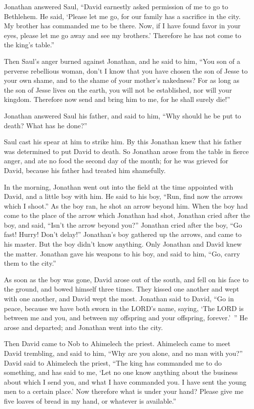 \myverse{}Jonathan answered Saul, “David earnestly asked permission of
me to go to Bethlehem.
\myverse{}He said, ‘Please let me go, for our family has a sacrifice in the city. My
brother has commanded me to be there. Now, if I have found favor in your eyes, please let me go away and
see my brothers.’ Therefore he has not come to the king’s table.”

\myverse{}Then Saul’s anger burned against Jonathan, and he said to him,
“You son of a perverse rebellious woman, don’t I know that you have chosen the son of Jesse to your own
shame, and to the shame of your mother’s nakedness?
\myverse{}For as long as the son of Jesse lives on the earth, you will not be established,
nor will your kingdom. Therefore now send and bring him to me, for he shall surely die!”

\myverse{}Jonathan answered Saul his father, and said to him, “Why should
he be put to death? What has he done?”

\myverse{}Saul cast his spear at him to strike him. By this Jonathan knew
that his father was determined to put David to death.
\myverse{}So Jonathan arose from the table in fierce anger, and ate no food the second
day of the month; for he was grieved for David, because his father had treated him shamefully.

\myverse{}In the morning, Jonathan went out into the field at the time
appointed with David, and a little boy with him.
\myverse{}He said to his boy, “Run, find now the arrows which I shoot.” As the boy
ran, he shot an arrow beyond him.
\myverse{}When the boy had come to the place of the arrow which Jonathan had shot,
Jonathan cried after the boy, and said, “Isn’t the arrow beyond you?”
\myverse{}Jonathan cried after the boy, “Go fast! Hurry! Don’t delay!” Jonathan’s boy
gathered up the arrows, and came to his master.
\myverse{}But the boy didn’t know anything. Only Jonathan and David knew the matter.
\myverse{}Jonathan gave his weapons to his boy, and said to him, “Go, carry them to
the city.”

\myverse{}As soon as the boy was gone, David arose out of the south, and
fell on his face to the ground, and bowed himself three times. They kissed one another and wept with one
another, and David wept the most.
\myverse{}Jonathan said to David, “Go in peace, because we have both sworn in the LORD’s
name, saying, ‘The LORD is between me and you, and between my offspring and your offspring, forever.’ ”
He arose and departed; and Jonathan went into the city.


\mychapter{} \myverse*{}Then David came to Nob to Ahimelech the priest. Ahimelech came
to meet David trembling, and said to him, “Why are you alone, and no man with you?”
\myverse{}David said to Ahimelech the priest, “The king has commanded me to do something,
and has said to me, ‘Let no one know anything about the business about which I send you, and what I have
commanded you. I have sent the young men to a certain place.’
\myverse{}Now therefore what is under your hand? Please give me five loaves of bread
in my hand, or whatever is available.”

